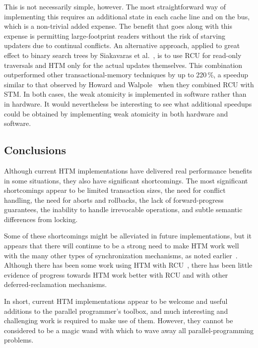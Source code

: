 This is not necessarily simple, however.
The most straightforward way of implementing this requires an additional
state in each cache line and on the bus, which is a non-trivial added
expense.
The benefit that goes along with this expense is permitting
large-footprint readers without the risk of starving updaters due
to continual conflicts.
An alternative approach, applied to great effect to binary search trees
by Siakavaras et al.~\cite{Siakavaras2017CombiningHA},
is to use RCU for read-only traversals and HTM
only for the actual updates themselves.
This combination outperformed other transactional-memory techniques by
up to 220\,\%, a speedup similar to that observed by
Howard and Walpole~\cite{PhilHoward2011RCUTMRBTree}
when they combined RCU with STM\@.
In both cases, the weak atomicity is implemented in software rather than
in hardware.
It would nevertheless be interesting to see what additional speedups
could be obtained by implementing weak atomicity in both hardware and
software.

\subsection{Conclusions}
\label{sec:future:Conclusions}

Although current HTM implementations have delivered real performance
benefits in some situations, they also have significant shortcomings.
The most significant shortcomings appear to be
limited transaction sizes,
the need for conflict handling, the need for aborts and rollbacks,
the lack of forward-progress guarantees,
the inability to handle irrevocable operations,
and subtle semantic differences
from locking.

Some of these shortcomings might be alleviated in future implementations,
but it appears that there will continue to be a strong need to make
HTM work well with the many other types of synchronization mechanisms,
as noted earlier~\cite{McKenney2007PLOSTM,PaulEMcKenney2010OSRGrassGreener}.
Although there has been some work using HTM with
RCU~\cite{Siakavaras2017CombiningHA,DimitriosSiakavaras2020RCU-HTM-B+Trees,ChristinaGiannoula2018HTM-RCU-graphcoloring,SeongJaePark2020HTMRCUlock},
there has been little evidence of progress towards HTM work better with
RCU and with other deferred-reclamation mechanisms.

In short, current HTM implementations appear to be welcome and useful
additions to the parallel programmer's toolbox, and much interesting
and challenging work is required to make use of them.
However, they cannot be
considered to be a magic wand with which to wave away all parallel-programming
problems.
